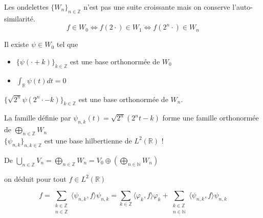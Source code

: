 \documentclass[french]{beamer}
\begin{document}
\begin{frame}{Les ondelettes}
	$\{W_n\}_{n \in \mathbb{Z}}$ n'est pas une suite croissante mais on conserve l'auto-similarité.
	\pause
	$$f \in W_0 \Longleftrightarrow f(2 \cdot ) \in W_1 \Longleftrightarrow f(2^n \cdot) \in W_n$$
	
	\pause
	Il existe $\psi \in W_0$ tel que \\
	\pause
	\begin{itemize}
		\item $\{\psi(\cdot + k)\}_{k \in \mathbb{Z}}$ est une base orthonormée de $W_0$
		\pause
		\item $\displaystyle \int_{\mathbb{R}} \psi(t) dt = 0$ \\
	\end{itemize}
	
	\pause
	$\{\sqrt{2^n} \psi(2^n\cdot - k)\}_{k \in \mathbb{Z}}$ est une base orthonormée de $W_n$.\\
	
	\pause	
	
	La famille définie par $\psi_{n, k}(t) = \sqrt{2^n}(2^n t - k)$ forme une famille orthonormée de $\displaystyle \bigoplus_{n \in \mathbb{Z}} W_n$\\
	\pause
	$\{\psi_{n, k}\}_{n, k \in \mathbb{Z}}$ est une base hilbertienne de $L^2(\mathbb{R})$ !
\end{frame}

\begin{frame}
	De $\displaystyle \bigcup_{n \in \mathbb{Z}} V_n = \bigoplus_{n \in \mathbb{Z}} W_n = V_0 \oplus \left(\bigoplus_{n \in \mathbb{N}} W_n\right)$

	\pause

	on déduit pour tout $f \in L^2(\mathbb{R})$
	
	$$f= \sum_{\substack{k \in \mathbb{Z} \\ n \in \mathbb{Z}}} \langle \psi_{n, k}, f \rangle \psi_{n, k} = \sum_{k \in \mathbb{Z}} \langle \varphi_k, f \rangle \varphi_k + \sum_{\substack{k \in \mathbb{Z} \\ n \in \mathbb{N}}} \langle \psi_{n, k}, f \rangle \psi_{n, k} $$
\end{frame}
\end{document}

